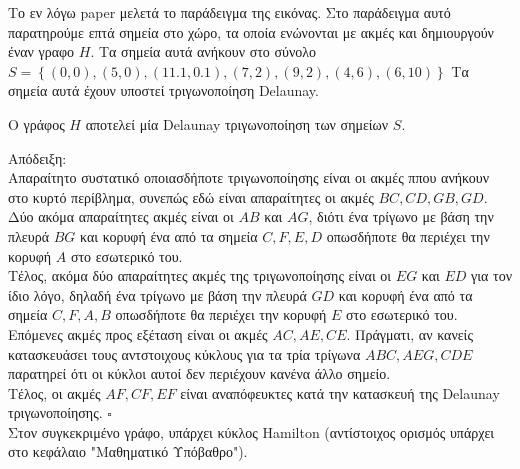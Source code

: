 \documentclass[oneside,12pt]{book}
\theoremstyle{definition}
\begin{document}
Το εν λόγω paper μελετά το παράδειγμα της εικόνας. Στο παράδειγμα αυτό παρατηρούμε επτά σημεία στο χώρο, τα οποία ενώνονται με ακμές και δημιουργούν έναν γραφο \(H\). Τα σημεία αυτά ανήκουν στο σύνολο \(S = \left\{(0,0),(5,0),(11.1,0.1),(7,2),(9,2),(4,6),(6,10)\right\}\) Τα σημεία αυτά έχουν υποστεί τριγωνοποίηση Delaunay. \\

\begin{mylemma}{}{}
	Ο γράφος \(Η\) αποτελεί μία Delaunay τριγωνοποίηση των σημείων \(S\).
\end{mylemma}

Απόδειξη: \\
Απαραίτητο συστατικό οποιασδήποτε τριγωνοποίησης είναι οι ακμές ππου ανήκουν στο κυρτό περίβλημα, συνεπώς εδώ είναι απαραίτητες οι ακμές \(BC, CD, GB, GD\). \\
Δύο ακόμα απαραίτητες ακμές είναι οι \(AB\) και \(AG\), διότι ένα τρίγωνο με βάση την πλευρά \(BG\) και κορυφή ένα από τα σημεία \(C, F, E, D\) οπωσδήποτε θα περιέχει την κορυφή \(A\) στο εσωτερικό του. \\
Τέλος, ακόμα δύο απαραίτητες ακμές της τριγωνοποίησης είναι οι \(EG\) και \(ED\) για τον ίδιο λόγο, δηλαδή ένα τρίγωνο με βάση την πλευρά \(GD\) και κορυφή ένα από τα σημεία \(C, F, A, B\) οπωσδήποτε θα περιέχει την κορυφή \(E\) στο εσωτερικό του. \\
Επόμενες ακμές προς εξέταση είναι οι ακμές \(AC, AE, CE\). Πράγματι, αν κανείς κατασκευάσει τους αντστοιχους κύκλους για τα τρία τρίγωνα \(ABC, AEG, CDE\) παρατηρεί ότι οι κύκλοι αυτοί δεν περιέχουν κανένα άλλο σημείο. \\
Τέλος, οι ακμές \(AF, CF, EF\) είναι αναπόφευκτες κατά την κατασκευή της Delaunay τριγωνοποίησης. \(\square\) \\

Στον συγκεκριμένο γράφο, υπάρχει κύκλος Hamilton (αντίστοιχος ορισμός υπάρχει στο κεφάλαιο "Μαθηματικό Υπόβαθρο").
\end{document}
